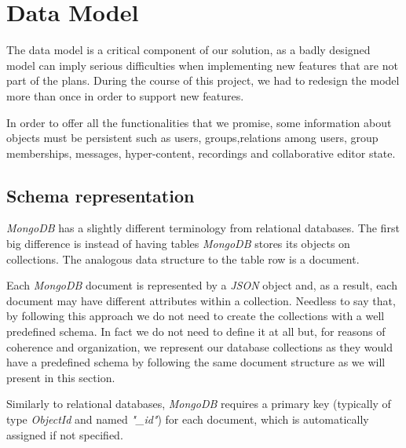 
\section{Data Model}
The data model is a critical component of our solution, as a badly designed model can imply serious difficulties when implementing new features that are not part of the plans. During the course of this project, we had to redesign the model more than once in order to support new features.


In order to offer all the functionalities that we promise, some information about objects must be persistent such as users, groups,relations among users, group memberships, messages, hyper-content, recordings and collaborative editor state.

\subsection {Schema representation}
    \emph{MongoDB} has a slightly different terminology from relational databases. The first big difference is instead of having tables \emph{MongoDB} stores its objects on collections. The analogous data structure to the table row is a document.

    Each \emph{MongoDB} document is represented by a \emph{JSON} object and, as a result, each document may have different attributes within a collection. Needless to say that, by following this approach we do not need to create the collections with a well predefined schema. In fact we do not need to define it at all but, for reasons of coherence and organization, we represent our database collections as they would have a predefined schema by following the same document structure as we will present in this section.

    Similarly to relational databases, \emph{MongoDB} requires a primary key (typically of type \emph{ObjectId} and named \emph{"\_id"}) for each document, which is automatically assigned if not specified. 

